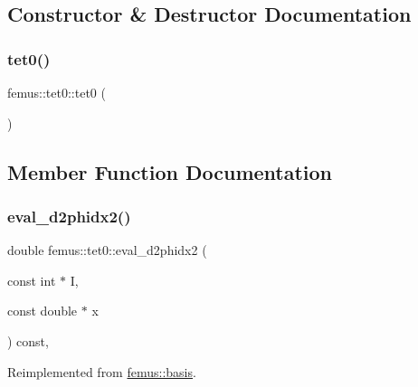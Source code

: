 \subsection{Constructor \& Destructor Documentation}
\mbox{\label{classfemus_1_1tet0_aa4de0524f2b5584f2627b4497226e58c}} 
\subsubsection{\texorpdfstring{tet0()}{tet0()}}
{\footnotesize\ttfamily femus\+::tet0\+::tet0 (\begin{DoxyParamCaption}{ }\end{DoxyParamCaption})\hspace{0.3cm}{\ttfamily [inline]}}



\subsection{Member Function Documentation}
\mbox{\label{classfemus_1_1tet0_a59411acd2cd35da162ad6487fa947a68}} 
\subsubsection{\texorpdfstring{eval\+\_\+d2phidx2()}{eval\_d2phidx2()}}
{\footnotesize\ttfamily double femus\+::tet0\+::eval\+\_\+d2phidx2 (\begin{DoxyParamCaption}\item[{const int $\ast$}]{I,  }\item[{const double $\ast$}]{x }\end{DoxyParamCaption}) const\hspace{0.3cm}{\ttfamily [inline]}, {\ttfamily [virtual]}}



Reimplemented from \mbox{\hyperlink{classfemus_1_1basis_a0a9839e75d1c9c8302486fc072eed028}{femus\+::basis}}.

\mbox{\label{classfemus_1_1tet0_a22abf82712c0aa6a561280f8d9bef8ff}} 
